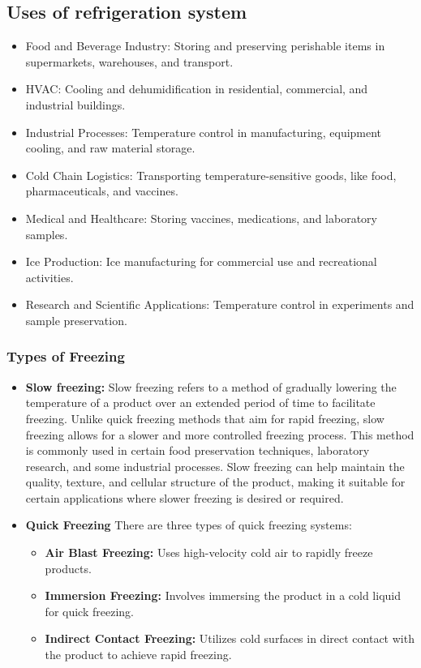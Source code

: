 \documentclass{article}
\begin{document}
\subsection*{Uses of refrigeration system}
\begin{itemize}
  \item Food and Beverage Industry: Storing and preserving perishable items in supermarkets, warehouses, and transport.

  \item HVAC: Cooling and dehumidification in residential, commercial, and industrial buildings.
  
  \item Industrial Processes: Temperature control in manufacturing, equipment cooling, and raw material storage.
  
  \item Cold Chain Logistics: Transporting temperature-sensitive goods, like food, pharmaceuticals, and vaccines.
  
  \item Medical and Healthcare: Storing vaccines, medications, and laboratory samples.
  
  \item Ice Production: Ice manufacturing for commercial use and recreational activities.
  
  \item Research and Scientific Applications: Temperature control in experiments and sample preservation.
\end{itemize}
\vspace{0.5cm}

\subsubsection*{Types of Freezing}
\begin{itemize}
  \item \textbf{Slow freezing: }Slow freezing refers to a method of gradually lowering the temperature of a product over an extended period of time to facilitate freezing. Unlike quick freezing methods that aim for rapid freezing, slow freezing allows for a slower and more controlled freezing process. This method is commonly used in certain food preservation techniques, laboratory research, and some industrial processes. Slow freezing can help maintain the quality, texture, and cellular structure of the product, making it suitable for certain applications where slower freezing is desired or required.
  \item \textbf{Quick Freezing} 
  There are three types of quick freezing systems:
  \begin{itemize}
    \item \textbf{Air Blast Freezing:} Uses high-velocity cold air to rapidly freeze products.
    \item \textbf{Immersion Freezing:} Involves immersing the product in a cold liquid for quick freezing.
    \item \textbf{Indirect Contact Freezing:} Utilizes cold surfaces in direct contact with the product to achieve rapid freezing.
  \end{itemize}
\end{itemize}
\end{document}
